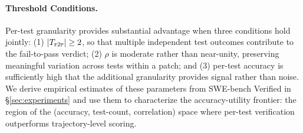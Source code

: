 \paragraph{Threshold Conditions.}
Per-test granularity provides substantial advantage when three conditions hold jointly: (1) $|T_{\textsc{f2p}}| \geq 2$, so that multiple independent test outcomes contribute to the fail-to-pass verdict; (2) $\rho$ is moderate rather than near-unity, preserving meaningful variation across tests within a patch; and (3) per-test accuracy is sufficiently high that the additional granularity provides signal rather than noise. We derive empirical estimates of these parameters from SWE-bench Verified in \S\ref{sec:experiments} and use them to characterize the accuracy-utility frontier: the region of the (accuracy, test-count, correlation) space where per-test verification outperforms trajectory-level scoring.
